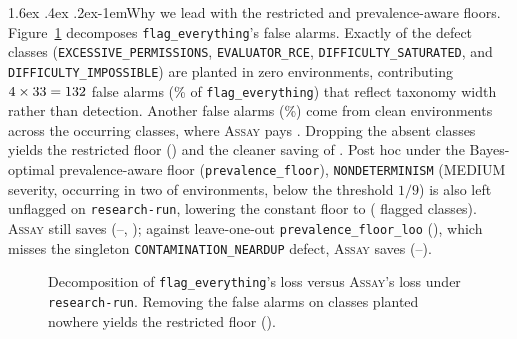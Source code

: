 \documentclass[11pt]{article}
\makeatletter
\renewcommand\paragraph{\@startsection{paragraph}{4}{\z@}%
  {1.6ex \@plus .4ex \@minus .2ex}{-1em}{\normalfont\normalsize\bfseries}}
\newcommand{\assay}{\textsc{Assay}}
\newcommand{\fe}{\texttt{flag\_everything}}
\newcommand{\pf}{\texttt{prevalence\_floor}}
\makeatother
\begin{document}
\paragraph{Why we lead with the restricted and prevalence-aware floors.} Figure~\ref{fig:floor}
decomposes \fe{}'s \lossFlagEverything{} false alarms. Exactly \nClassesAbsent{} of the \nClasses{}
defect classes (\texttt{EXCESSIVE\_PERMISSIONS}, \texttt{EVALUATOR\_RCE},
\texttt{DIFFICULTY\_SATURATED}, and \texttt{DIFFICULTY\_IMPOSSIBLE}) are planted in zero
environments, contributing $4{}\times33{}=132{}$ false alarms
(\pctFloorAbsent{}\% of \fe{}) that reflect taxonomy width rather than detection. Another
\floorClean{} false alarms (\pctFloorClean{}\%) come from \nCleanEnv{} clean environments across the
\nClassesPresent{} occurring classes, where \assay{} pays \assayCleanFA{}. Dropping the
\nClassesAbsent{} absent classes yields the restricted floor (\floorRestricted{}) and the cleaner
saving of \savedRestricted{}. Post hoc under the Bayes-optimal prevalence-aware floor (\pf{}),
\texttt{NONDETERMINISM} (MEDIUM severity, occurring in two of \nEnv{} environments, below the
threshold $1/9$) is also left unflagged on \texttt{research-run}, lowering the constant floor to
\lossPrevResearch{} (\prevFlaggedNResearch{} flagged classes). \assay{} still saves
\savedPrevResearch{} (\loSavedPrevResearch--\hiSavedPrevResearch{}, \sepPrevResearch{}); against
leave-one-out \texttt{prevalence\_floor\_loo} (\lossPrevLooResearch{}), which misses the singleton
\texttt{CONTAMINATION\_NEARDUP} defect, \assay{} saves \savedPrevLooResearch{}
(\loSavedPrevLooResearch--\hiSavedPrevLooResearch{}).

\begin{figure}[t]\centering

\caption{Decomposition of \fe{}'s loss versus \assay{}'s loss under \texttt{research-run}. Removing
the \floorAbsent{} false alarms on classes planted nowhere yields the restricted floor
(\floorRestricted{}).}
\label{fig:floor}
\end{figure}
\end{document}
